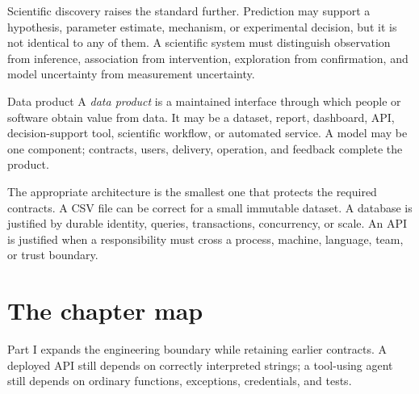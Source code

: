 Scientific discovery raises the standard further. Prediction may support a
hypothesis, parameter estimate, mechanism, or experimental decision, but it is
not identical to any of them. A scientific system must distinguish observation
from inference, association from intervention, exploration from confirmation,
and model uncertainty from measurement uncertainty.

\begin{definitionbox}{Data product}
A \emph{data product} is a maintained interface through which people or
software obtain value from data. It may be a dataset, report, dashboard, API,
decision-support tool, scientific workflow, or automated service. A model may
be one component; contracts, users, delivery, operation, and feedback complete
the product.
\end{definitionbox}

The appropriate architecture is the smallest one that protects the required
contracts. A CSV file can be correct for a small immutable dataset. A database
is justified by durable identity, queries, transactions, concurrency, or scale.
An API is justified when a responsibility must cross a process, machine,
language, team, or trust boundary.


\section{The chapter map}

Part I expands the engineering boundary while retaining earlier contracts. A
deployed API still depends on correctly interpreted strings; a tool-using agent
still depends on ordinary functions, exceptions, credentials, and tests.

